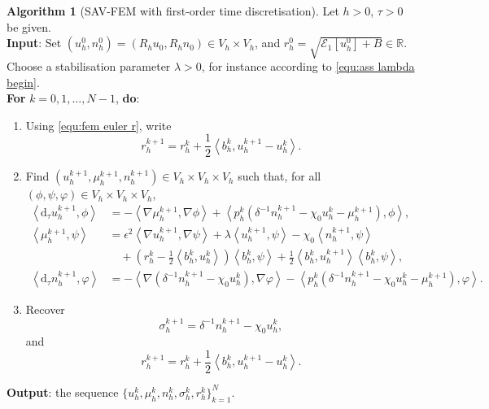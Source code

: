 \documentclass[11pt, reqno]{amsart}
\theoremstyle{definition}
\newtheorem{algorithm}[theorem]{Algorithm}
\numberwithin{equation}{section}
\newcommand{\bb}{\mathbb}
\newcommand{\dtt}{\mathrm{d}_\tau}
\newcommand{\inpro}[2]{\left\langle#1,#2\right\rangle}
\begin{document}
\begin{algorithm}[SAV-FEM with first-order time discretisation]\label{alg:sav}
	Let $h>0$, $\tau>0$ be given. 
	\\
	\textbf{Input}: Set $(u_h^0,n_h^0)=(R_hu_0,R_hn_0)\in V_h\times V_h$, and $r_h^0=\sqrt{\mathcal E_1[u_h^0]+B} \in \bb{R}$. Choose a stabilisation parameter $\lambda>0$, for instance according to \eqref{equ:ass lambda begin}.
	\\
	\textbf{For} $k=0,1,\ldots,N-1$, \textbf{do}:
	\begin{enumerate}
		\item Using \eqref{equ:fem euler r}, write
		\[
		r_h^{k+1}
		=
		r_h^k
		+
		\frac12\inpro{b_h^k}{u_h^{k+1}-u_h^k}.
		\]
		
		\item Find $(u_h^{k+1},\mu_h^{k+1},n_h^{k+1})\in V_h\times V_h\times V_h$ such that, for all
		$(\phi,\psi,\varphi)\in V_h\times V_h\times V_h$,
		\begin{align}
			\inpro{\dtt u_h^{k+1}}{\phi}
			&=
			-\inpro{\nabla\mu_h^{k+1}}{\nabla\phi}
			+
			\inpro{
				p_h^k
				\left(
				\delta^{-1}n_h^{k+1}
				-\chi_0u_h^k
				-\mu_h^{k+1}
				\right)
			}{\phi},
			\label{equ:alg-elim-u}
			\\
			\inpro{\mu_h^{k+1}}{\psi}
			&=
			\epsilon^2\inpro{\nabla u_h^{k+1}}{\nabla\psi}
			+
			\lambda\inpro{u_h^{k+1}}{\psi}
			-
			\chi_0\inpro{n_h^{k+1}}{\psi}
			\nonumber\\
			&\quad
			+
			\left(
			r_h^k-\frac12\inpro{b_h^k}{u_h^k}
			\right)
			\inpro{b_h^k}{\psi}
			+
			\frac12
			\inpro{b_h^k}{u_h^{k+1}}
			\inpro{b_h^k}{\psi},
			\label{equ:alg-elim-mu}
			\\
			\inpro{\dtt n_h^{k+1}}{\varphi}
			&=
			-\inpro{
				\nabla\left(
				\delta^{-1}n_h^{k+1}
				-\chi_0 u_h^k
				\right)
			}{\nabla\varphi}
			-
			\inpro{
				p_h^k
				\left(
				\delta^{-1}n_h^{k+1}
				-\chi_0u_h^k
				-\mu_h^{k+1}
				\right)
			}{\varphi}.
			\label{equ:alg-elim-n}
		\end{align}
		
		\item Recover
		\[
		\sigma_h^{k+1}
		=
		\delta^{-1}n_h^{k+1}
		-
		\chi_0u_h^k,
		\]
		and
		\[
		r_h^{k+1}
		=
		r_h^k
		+
		\frac12\inpro{b_h^k}{u_h^{k+1}-u_h^k}.
		\]
	\end{enumerate}
	
	\textbf{Output}: the sequence $\{u_h^k,\mu_h^k,n_h^k,\sigma_h^k,r_h^k\}_{k=1}^{N}$.
\end{algorithm}
\end{document}

